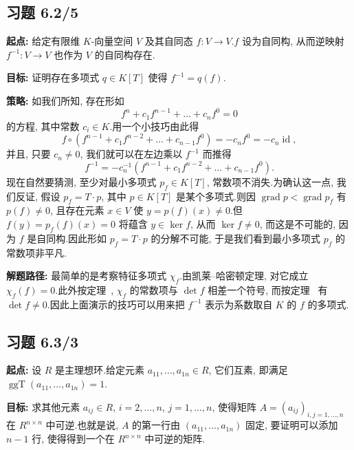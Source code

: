 \subsection*{习题 6.2/5}

\noindent\textbf{起点:} 给定有限维 $K$-向量空间 $V$ 及其自同态 $f \colon V \longrightarrow V$.$f$ 设为自同构, 从而逆映射 $f^{-1} \colon V \longrightarrow V$ 也作为 $V$ 的自同构存在.

\noindent\textbf{目标:} 证明存在多项式 $q \in K[T]$ 使得 $f^{-1} = q(f)$.

\noindent\textbf{策略:} 如我们所知, 存在形如
\[
f^n + c_1 f^{n - 1} + \ldots + c_n f^0 = 0
\]
的方程, 其中常数 $c_i \in K$.用一个小技巧由此得
\[
f \circ (f^{n - 1} + c_1 f^{n - 2} + \ldots + c_{n - 1} f^0) = -c_n f^0 = -c_n \operatorname{id},
\]
并且, 只要 $c_n \neq 0$, 我们就可以在左边乘以 $f^{-1}$ 而推得
\[
f^{-1} = -c_n^{-1}(f^{n - 1} + c_1 f^{n - 2} + \ldots + c_{n - 1} f^0)\text{.}
\]
现在自然要猜测, 至少对最小多项式 $p_f \in K[T]$, 常数项不消失.为确认这一点, 我们反证, 假设 $p_f = T \cdot p$, 其中 $p \in K[T]$ 是某个多项式.则因 $\operatorname{grad} p < \operatorname{grad} p_f$ 有 $p(f) \neq 0$, 且存在元素 $x \in V$ 使 $y = p(f)(x) \neq 0$.但 $f(y) = p_f(f)(x) = 0$ 将蕴含 $y \in \ker f$, 从而 $\ker f \neq 0$, 而这是不可能的, 因为 $f$ 是自同构.因此形如 $p_f = T \cdot p$ 的分解不可能, 于是我们看到最小多项式 $p_f$ 的常数项非平凡.

\noindent\textbf{解题路径:} 最简单的是考察特征多项式 $\chi_f$.由凯莱--哈密顿定理, 对它成立 $\chi_f(f) = 0$.此外按定理~, $\chi_f$ 的常数项与 $\det f$ 相差一个符号, 而按定理~ 有 $\det f \neq 0$.因此上面演示的技巧可以用来把 $f^{-1}$ 表示为系数取自 $K$ 的 $f$ 的多项式.

\subsection*{习题 6.3/3}

\noindent\textbf{起点:} 设 $R$ 是主理想环.给定元素 $a_{11}, \ldots, a_{1n} \in R$, 它们互素, 即满足 $\operatorname{ggT}(a_{11}, \ldots, a_{1n}) = 1$.

\noindent\textbf{目标:} 求其他元素 $a_{ij} \in R$, $i = 2, \ldots, n$, $j = 1, \ldots, n$, 使得矩阵 $A = (a_{ij})_{i, j = 1, \ldots, n}$ 在 $R^{n \times n}$ 中可逆.也就是说, $A$ 的第一行由 $(a_{11}, \ldots, a_{1n})$ 固定, 要证明可以添加 $n - 1$ 行, 使得得到一个在 $R^{n \times n}$ 中可逆的矩阵.

